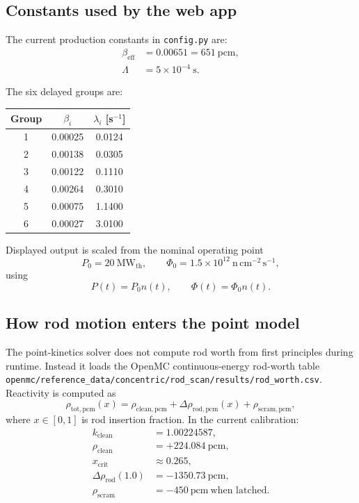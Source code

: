 \documentclass[11pt]{article}
\begin{document}
\subsection{Constants used by the web app}

The current production constants in \texttt{config.py} are:
\begin{align*}
\beta_{\mathrm{eff}} &= 0.00651 = 651\ \mathrm{pcm}, \\
\Lambda &= 5\times 10^{-4}\ \mathrm{s}.
\end{align*}

The six delayed groups are:

\begin{center}
\begin{tabular}{ccc}
\toprule
Group & $\beta_i$ & $\lambda_i$ [s$^{-1}$] \\
\midrule
1 & 0.00025 & 0.0124 \\
2 & 0.00138 & 0.0305 \\
3 & 0.00122 & 0.1110 \\
4 & 0.00264 & 0.3010 \\
5 & 0.00075 & 1.1400 \\
6 & 0.00027 & 3.0100 \\
\bottomrule
\end{tabular}
\end{center}

Displayed output is scaled from the nominal operating point
\[
P_0 = 20\ \mathrm{MW_{th}}, \qquad
\Phi_0 = 1.5\times 10^{12}\ \mathrm{n\,cm^{-2}\,s^{-1}},
\]
using
\[
P(t) = P_0 n(t), \qquad \Phi(t) = \Phi_0 n(t).
\]

\subsection{How rod motion enters the point model}

The point-kinetics solver does not compute rod worth from first principles during
runtime.  Instead it loads the OpenMC continuous-energy rod-worth table
\texttt{openmc/reference\_data/concentric/rod\_scan/results/rod\_worth.csv}.
Reactivity is computed as
\[
\rho_{\mathrm{tot,pcm}}(x)
= \rho_{\mathrm{clean,pcm}} + \Delta \rho_{\mathrm{rod,pcm}}(x)
+ \rho_{\mathrm{scram,pcm}},
\]
where $x \in [0,1]$ is rod insertion fraction.  In the current calibration:
\begin{align*}
k_{\mathrm{clean}} &= 1.00224587, \\
\rho_{\mathrm{clean}} &= +224.084\ \mathrm{pcm}, \\
x_{\mathrm{crit}} &\approx 0.265, \\
\Delta \rho_{\mathrm{rod}}(1.0) &= -1350.73\ \mathrm{pcm}, \\
\rho_{\mathrm{scram}} &= -450\ \mathrm{pcm}\ \text{when latched.}
\end{align*}
\end{document}
